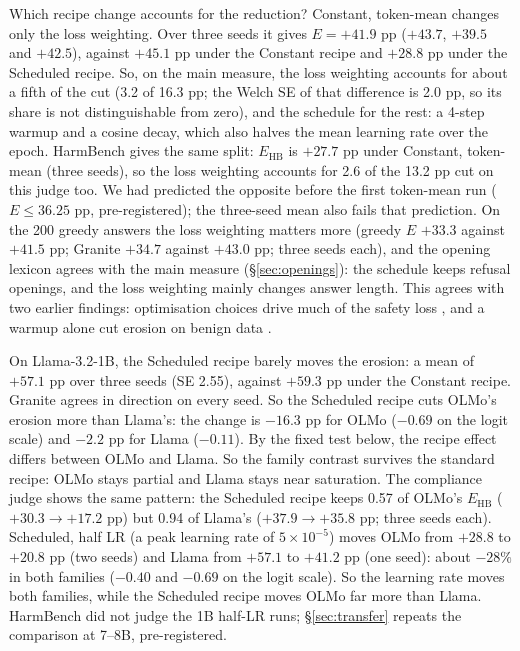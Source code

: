 \documentclass[11pt]{article}
\newcommand{\Ehb}{E_{\mathrm{HB}}}
\begin{document}
Which recipe change accounts for the reduction? Constant, token-mean
changes only the loss weighting. Over three seeds it gives
$E = +41.9$ pp ($+43.7$, $+39.5$ and $+42.5$), against $+45.1$ pp under the
Constant recipe and $+28.8$ pp under the Scheduled recipe. So, on the main
measure, the loss weighting accounts for about a fifth of the cut (3.2 of
16.3 pp; the Welch SE of that difference is 2.0 pp, so its share is not
distinguishable from zero), and the schedule for the rest: a 4-step warmup and a
cosine decay, which also halves the mean learning rate over the epoch. HarmBench
gives the same split: $\Ehb$ is $+27.7$ pp under Constant, token-mean (three
seeds), so the loss weighting accounts for 2.6 of the 13.2 pp cut on this judge
too. We had
predicted the opposite before the first token-mean run ($E \le 36.25$ pp,
pre-registered); the three-seed mean also fails that prediction. On the 200
greedy answers the loss weighting matters more (greedy $E$ $+33.3$ against
$+41.5$ pp; Granite $+34.7$ against $+43.0$ pp; three seeds each), and the
opening lexicon agrees with the main measure (\S\ref{sec:openings}): the
schedule keeps refusal openings, and the loss weighting mainly changes answer
length. This agrees with two earlier findings: optimisation choices drive much
of the safety loss \citep{kim2025rethinking}, and a warmup alone cut erosion
on benign data \citep{qi2025shallow}.

On Llama-3.2-1B, the Scheduled recipe barely moves the erosion: a mean of
$+57.1$ pp over three seeds (SE 2.55), against $+59.3$ pp under the Constant
recipe. Granite agrees in direction on every seed. So the Scheduled recipe cuts
OLMo's erosion more than Llama's: the change is $-16.3$ pp for OLMo ($-0.69$ on
the logit scale) and $-2.2$ pp for Llama ($-0.11$). By the fixed test below, the
recipe effect differs between OLMo and Llama. So the family contrast survives
the standard recipe: OLMo stays partial and Llama stays near saturation. The
compliance judge shows the same pattern: the Scheduled recipe keeps 0.57 of
OLMo's $\Ehb$ ($+30.3 \to +17.2$ pp) but 0.94 of Llama's ($+37.9 \to +35.8$ pp;
three seeds each). Scheduled, half LR (a peak
learning rate of $5 \times 10^{-5}$) moves OLMo from $+28.8$ to $+20.8$ pp (two
seeds) and Llama from $+57.1$ to $+41.2$ pp (one seed): about $-28\%$ in both
families ($-0.40$ and $-0.69$ on the logit scale). So the learning rate moves
both families, while the Scheduled recipe moves OLMo far more than Llama.
HarmBench did not judge the 1B half-LR runs; \S\ref{sec:transfer} repeats the
comparison at 7--8B, pre-registered.
\end{document}
